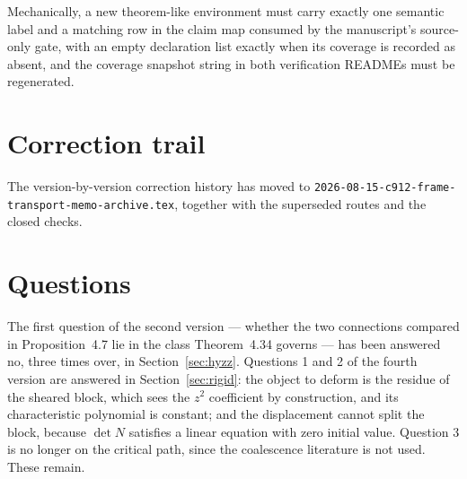 \documentclass[11pt]{article}
\theoremstyle{definition}
\theoremstyle{remark}
\begin{document}
Mechanically, a new theorem-like environment must carry exactly one semantic
label and a matching row in the claim map consumed by the manuscript's
source-only gate, with an empty declaration list exactly when its coverage is
recorded as absent, and the coverage snapshot string in both verification
READMEs must be regenerated.

\section{Correction trail}
\label{sec:corrections}

The version-by-version correction history has moved to
\texttt{2026-08-15-c912-frame-transport-memo-archive.tex}, together with
the superseded routes and the closed checks.

\section{Questions}

The first question of the second version --- whether the two connections
compared in Proposition~4.7 lie in the class Theorem~4.34 governs --- has been
answered no, three times over, in Section~\ref{sec:hyzz}. Questions 1 and 2 of
the fourth version are answered in Section~\ref{sec:rigid}: the object to deform
is the residue of the sheared block, which sees the $z^2$ coefficient by
construction, and its characteristic polynomial is constant; and the
displacement cannot split the block, because $\det N$ satisfies a linear
equation with zero initial value. Question 3 is no longer on the critical path,
since the coalescence literature is not used. These remain.
\end{document}
